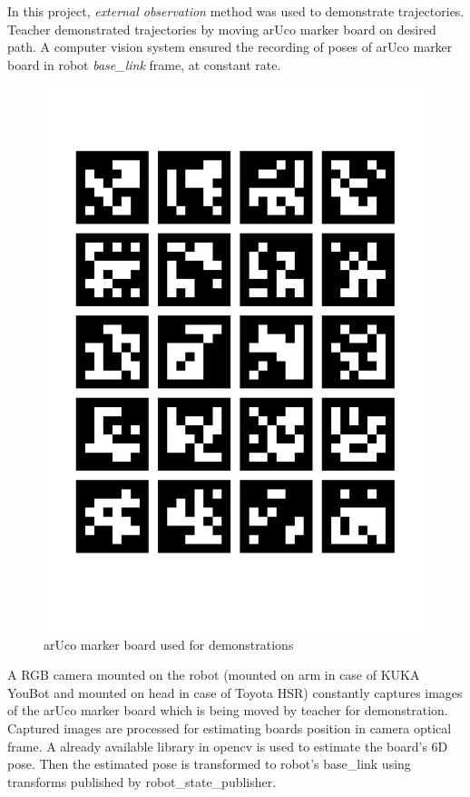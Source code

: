 In this project, \textit{external observation} method was used to demonstrate trajectories. Teacher demonstrated trajectories by moving arUco marker board on desired path. A computer vision system ensured the recording of poses of arUco marker board in robot \textit{base\_link} frame, at constant rate. 

\begin{figure}[H]
	\centering
	\includegraphics[scale=0.3]{images/aruco_marker_board.pdf}
	\caption{arUco marker board used for demonstrations}
	\label{fig:aruco_marker_board}
\end{figure}

A RGB camera mounted on the robot (mounted on arm in case of KUKA YouBot and mounted on head in case of Toyota HSR) constantly captures images of the arUco marker board which is being moved by teacher for demonstration. Captured images are processed for estimating boards position in camera optical frame. A already available library in opencv is used to estimate the board's 6D pose. Then the estimated pose is transformed to robot's base\_link using transforms published by robot\_state\_publisher. 

